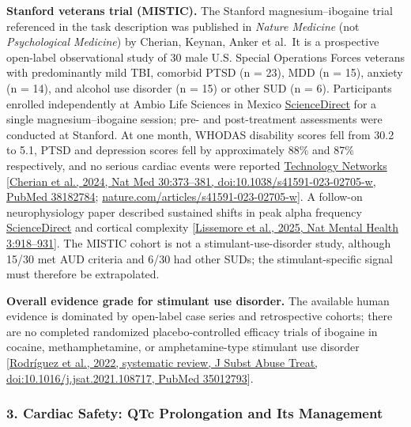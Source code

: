 \textbf{Stanford veterans trial (MISTIC).} The Stanford magnesium--ibogaine trial referenced in the task description was published in \emph{Nature Medicine} (not \emph{Psychological Medicine}) by Cherian, Keynan, Anker et al.~It is a prospective open-label observational study of 30 male U.S. Special Operations Forces veterans with predominantly mild TBI, comorbid PTSD (n = 23), MDD (n = 15), anxiety (n = 14), and alcohol use disorder (n = 15) or other SUD (n = 6). Participants enrolled independently at Ambio Life Sciences in Mexico \href{https://www.sciencedirect.com/science/article/abs/pii/S0165032725021640}{ScienceDirect} for a single magnesium--ibogaine session; pre- and post-treatment assessments were conducted at Stanford. At one month, WHODAS disability scores fell from 30.2 to 5.1, PTSD and depression scores fell by approximately 88\% and 87\% respectively, and no serious cardiac events were reported \href{https://www.technologynetworks.com/drug-discovery/news/african-psychedelic-ibogaine-reduces-veterans-brain-injury-symptoms-in-small-trial-382964}{Technology Networks} {[}\href{https://pubmed.ncbi.nlm.nih.gov/38182784/}{Cherian et al., 2024, Nat Med 30:373--381, doi:10.1038/s41591-023-02705-w, PubMed 38182784}; \href{https://www.nature.com/articles/s41591-023-02705-w}{nature.com/articles/s41591-023-02705-w}{]}. A follow-on neurophysiology paper described sustained shifts in peak alpha frequency \href{https://www.sciencedirect.com/science/article/abs/pii/S0165032725021640}{ScienceDirect} and cortical complexity {[}\href{https://www.usmedicine.com/clinical-topics/tbi/magnesium-ibogaine-therapy-could-offer-treatment-option-for-tbi/}{Lissemore et al., 2025, Nat Mental Health 3:918--931}{]}. The MISTIC cohort is not a stimulant-use-disorder study, although 15/30 met AUD criteria and 6/30 had other SUDs; the stimulant-specific signal must therefore be extrapolated.

\textbf{Overall evidence grade for stimulant use disorder.} The available human evidence is dominated by open-label case series and retrospective cohorts; there are no completed randomized placebo-controlled efficacy trials of ibogaine in cocaine, methamphetamine, or amphetamine-type stimulant use disorder {[}\href{https://pubmed.ncbi.nlm.nih.gov/35012793/}{Rodríguez et al., 2022, systematic review, J Subst Abuse Treat, doi:10.1016/j.jsat.2021.108717, PubMed 35012793}{]}.

\subsubsection{3. Cardiac Safety: QTc Prolongation and Its Management}\label{20_ibogaine-cardiac-safety-qtc-prolongation-and-its-management}

